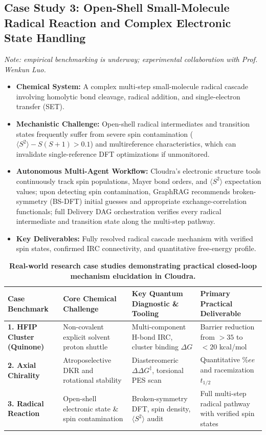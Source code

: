 \documentclass[10pt,twocolumn,letterpaper]{article}
\begin{document}
\subsection{Case Study 3: Open-Shell Small-Molecule Radical Reaction and Complex Electronic State Handling}
\textit{Note: empirical benchmarking is underway; experimental collaboration with Prof. Wenkun Luo.}
\begin{itemize}[leftmargin=*]
\item \textbf{Chemical System:} A complex multi-step small-molecule radical cascade involving homolytic bond cleavage, radical addition, and single-electron transfer (SET).
\item \textbf{Mechanistic Challenge:} Open-shell radical intermediates and transition states frequently suffer from severe spin contamination ($\langle S^2 \rangle - S(S+1) > 0.1$) and multireference characteristics, which can invalidate single-reference DFT optimizations if unmonitored.
\item \textbf{Autonomous Multi-Agent Workflow:} Cloudra's electronic structure tools continuously track spin populations, Mayer bond orders, and $\langle S^2 \rangle$ expectation values; upon detecting spin contamination, GraphRAG recommends broken-symmetry (BS-DFT) initial guesses and appropriate exchange-correlation functionals; full Delivery DAG orchestration verifies every radical intermediate and transition state along the multi-step pathway.
\item \textbf{Key Deliverables:} Fully resolved radical cascade mechanism with verified spin states, confirmed IRC connectivity, and quantitative free-energy profile.
\end{itemize}

\begin{table}[t]
\centering
\small
\caption{\textbf{Real-world research case studies demonstrating practical closed-loop mechanism elucidation in Cloudra.}}
\label{tab:benchmarks}
\begin{tabularx}{\textwidth}{lXXX}
\toprule
\textbf{Case Benchmark} & \textbf{Core Chemical Challenge} & \textbf{Key Quantum Diagnostic \& Tooling} & \textbf{Primary Practical Deliverable} \\
\midrule
\textbf{1. HFIP Cluster (Quinone)} & Non-covalent explicit solvent proton shuttle & Multi-component H-bond IRC, cluster binding $\Delta G$ & Barrier reduction from $>35$ to $<20$ kcal/mol \\
\textbf{2. Axial Chirality} & Atroposelective DKR and rotational stability & Diastereomeric $\Delta\Delta G^\ddagger$, torsional PES scan & Quantitative $\%ee$ and racemization $t_{1/2}$ \\
\textbf{3. Radical Reaction} & Open-shell electronic state \& spin contamination & Broken-symmetry DFT, spin density, $\langle S^2 \rangle$ audit & Full multi-step radical pathway with verified spin states \\
\bottomrule
\end{tabularx}
\end{table}
\end{document}
